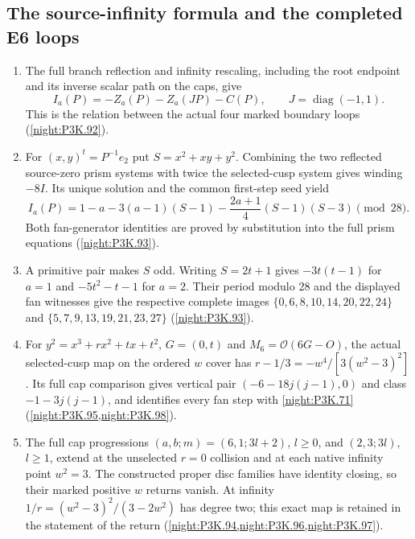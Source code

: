 \subsection{The source-infinity formula and the completed E6 loops}
\RungOne
\begin{enumerate}[label=\arabic*.]
\item The full branch reflection and infinity rescaling, including
  the root endpoint and its inverse scalar path on the caps, give
  \[
  I_a(P)=-Z_a(P)-Z_a(JP)-C(P),\qquad
  J=\operatorname{diag}(-1,1).
  \]
  This is the relation between the actual four marked boundary
  loops (\cref{night:P3K.92}).
\item For $(x,y)^t=P^{-1}e_2$ put $S=x^2+xy+y^2$.
  Combining the two reflected source-zero prism systems with
  twice the selected-cusp system gives winding $-8I$.
  Its unique solution and the common first-step seed yield
  \[
  I_a(P)=1-a-3(a-1)(S-1)
       -\frac{2a+1}{4}(S-1)(S-3)\pmod {28}.
  \]
  Both fan-generator identities are proved by substitution into
  the full prism equations (\cref{night:P3K.93}).
\item A primitive pair makes $S$ odd.  Writing $S=2t+1$ gives
  $-3t(t-1)$ for $a=1$ and $-5t^2-t-1$ for $a=2$.
  Their period modulo 28 and the displayed fan witnesses give
  the respective complete images
  $\{0,6,8,10,14,20,22,24\}$ and
  $\{5,7,9,13,19,21,23,27\}$
  (\cref{night:P3K.93}).
\item For $y^2=x^3+rx^2+tx+t^2$, $G=(0,t)$ and
  $M_6=\mathcal O(6G-O)$, the actual selected-cusp map on the
  ordered $w$ cover has
  $r-1/3=-w^4/[3(w^2-3)^2]$.
  Its full cap comparison gives vertical pair
  $(-6-18j(j-1),0)$ and class $-1-3j(j-1)$, and identifies
  every fan step with \cref{night:P3K.71}
  (\cref{night:P3K.95,night:P3K.98}).
\item The full cap progressions
  $(a,b;m)=(6,1;3l+2)$, $l\geq0$, and
  $(2,3;3l)$, $l\geq1$, extend at the unselected $r=0$
  collision and at each native infinity point $w^2=3$.
  The constructed proper disc families have identity closing,
  so their marked positive $w$ returns vanish.  At infinity
  $1/r=(w^2-3)^2/(3-2w^2)$ has degree two; this exact map is
  retained in the statement of the return
  (\cref{night:P3K.94,night:P3K.96,night:P3K.97}).
\end{enumerate}
